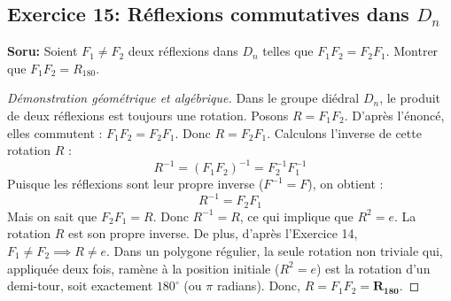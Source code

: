\documentclass[12pt,a4paper]{report}
\begin{document}
\subsection*{Exercice 15: Réflexions commutatives dans $D_n$}
\textbf{Soru:} Soient $F_1 \neq F_2$ deux réflexions dans $D_n$ telles que $F_1 F_2 = F_2 F_1$. Montrer que $F_1 F_2 = R_{180}$.
\begin{proof}[Démonstration géométrique et algébrique]
Dans le groupe diédral $D_n$, le produit de deux réflexions est toujours une rotation. Posons $R = F_1 F_2$.
D'après l'énoncé, elles commutent : $F_1 F_2 = F_2 F_1$. Donc $R = F_2 F_1$.
Calculons l'inverse de cette rotation $R$ :
\[ R^{-1} = (F_1 F_2)^{-1} = F_2^{-1} F_1^{-1} \]
Puisque les réflexions sont leur propre inverse ($F^{-1}=F$), on obtient :
\[ R^{-1} = F_2 F_1 \]
Mais on sait que $F_2 F_1 = R$. Donc $R^{-1} = R$, ce qui implique que $R^2 = e$.
La rotation $R$ est son propre inverse.
De plus, d'après l'Exercice 14, $F_1 \neq F_2 \implies R \neq e$.
Dans un polygone régulier, la seule rotation non triviale qui, appliquée deux fois, ramène à la position initiale ($R^2 = e$) est la rotation d'un demi-tour, soit exactement $180^\circ$ (ou $\pi$ radians).
Donc, $R = F_1 F_2 = \mathbf{R_{180}}$.
\end{proof}
\end{document}
